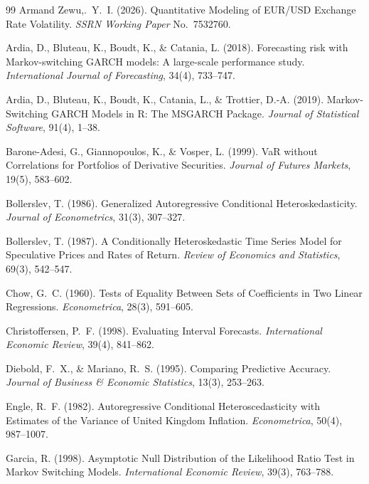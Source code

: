 \documentclass[12pt,a4paper]{article}
\begin{document}
\newpage
{}
\begin{thebibliography}{99}
	Armand Zewu,.~Y.~I. (2026). Quantitative Modeling of EUR/USD Exchange Rate Volatility. \textit{SSRN Working Paper} No.~7532760.

	Ardia, D., Bluteau, K., Boudt, K., \& Catania, L. (2018). Forecasting risk with Markov-switching GARCH models: A large-scale performance study. \textit{International Journal of Forecasting}, 34(4), 733--747.

	Ardia, D., Bluteau, K., Boudt, K., Catania, L., \& Trottier, D.-A.
	(2019). Markov-Switching GARCH Models in R: The MSGARCH Package.
	\textit{Journal of Statistical Software}, 91(4), 1--38.

	Barone-Adesi, G., Giannopoulos, K., \& Vosper, L. (1999). VaR without Correlations for Portfolios of Derivative Securities. \textit{Journal of Futures Markets}, 19(5), 583--602.

	Bollerslev, T. (1986). Generalized Autoregressive Conditional Heteroskedasticity. \textit{Journal of Econometrics}, 31(3), 307--327.

	Bollerslev, T. (1987). A Conditionally Heteroskedastic Time Series Model for Speculative Prices and Rates of Return. \textit{Review of Economics and Statistics}, 69(3), 542--547.

	Chow, G.~C. (1960). Tests of Equality Between Sets of Coefficients in Two Linear Regressions. \textit{Econometrica}, 28(3), 591--605.

	Christoffersen, P.~F. (1998). Evaluating Interval Forecasts. \textit{International Economic Review}, 39(4), 841--862.

	Diebold, F.~X., \& Mariano, R.~S. (1995). Comparing Predictive Accuracy. \textit{Journal of Business \& Economic Statistics}, 13(3), 253--263.

	Engle, R.~F. (1982). Autoregressive Conditional Heteroscedasticity with Estimates of the Variance of United Kingdom Inflation. \textit{Econometrica}, 50(4), 987--1007.

	Garcia, R. (1998). Asymptotic Null Distribution of the Likelihood Ratio Test in Markov Switching Models. \textit{International Economic Review}, 39(3), 763--788.


\end{thebibliography}
\end{document}
